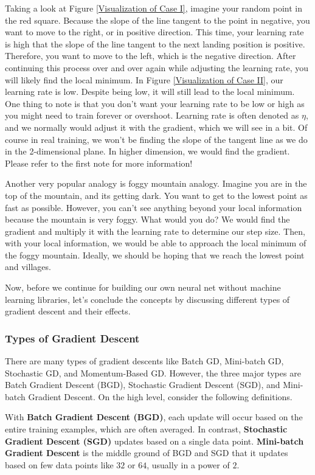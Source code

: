 \documentclass[../../main.tex]{subfiles}
\begin{document}
Taking a look at Figure \ref{Visualization of Case I}, imagine your
random point in the red square. Because the slope of the line
tangent to the point in negative, you want to move to the right,
or in positive direction. This time, your learning rate is high that
the slope of the line tangent to the next landing position is
positive. Therefore, you want to move to the left, which is the
negative direction. After continuing this process over and over again
while adjusting the learning rate, you will likely find the local
minimum. In Figure \ref{Visualization of Case II}, our learning
rate is low. Despite being low, it will still lead to the local
minimum. One thing to note is that you don't want your learning rate
to be low or high as you might need to train forever or overshoot.
Learning rate is often denoted as $\eta$, and we normally would
adjust it with the gradient, which we will see in a bit. Of course
in real training, we won't be finding the slope of the tangent line as
we do in the 2-dimensional plane. In higher dimension, we would find
the gradient. Please refer to the first note for more information!

Another very popular analogy is foggy mountain analogy. Imagine you
are in the top of the mountain, and its getting dark. You want to
get to the lowest point as fast as possible. However, you can't see
anything beyond your local information because the mountain is very
foggy. What would you do? We would find the gradient and multiply
it with the learning rate to determine our step size. Then, with
your local information, we would be able to approach the local
minimum of the foggy mountain. Ideally, we should be hoping that
we reach the lowest point and villages.

Now, before we continue for building our own neural net without
machine learning libraries, let's conclude the concepts by
discussing different types of gradient descent and their effects.

\subsubsection{Types of Gradient Descent}

There are many types of gradient descents like Batch GD,
Mini-batch GD, Stochastic GD, and Momentum-Based GD. However,
the three major types are Batch Gradient Descent (BGD), Stochastic
Gradient Descent (SGD), and Mini-batch Gradient Descent. On the
high level, consider the following definitions.

\begin{definition}{}{}
With \textbf{Batch Gradient Descent (BGD)}, each update will
occur based on the entire training examples, which are often
averaged. In contrast, \textbf{Stochastic Gradient Descent (SGD)}
updates based on a single data point. \textbf{Mini-batch Gradient
Descent} is the middle ground of BGD and SGD that it updates based
on few data points like $32$ or $64$, usually in a power of $2$.
\end{definition}
\end{document}
